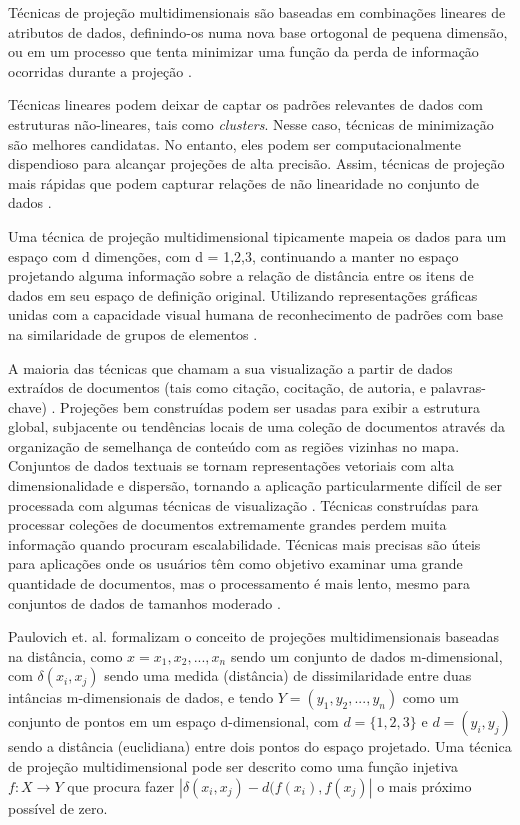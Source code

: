 Técnicas de projeção multidimensionais são baseadas em combinações lineares de atributos de dados, definindo-os numa nova base ortogonal de pequena dimensão, ou em um processo que tenta minimizar uma função da perda de informação ocorridas durante a projeção \cite{spence2001information}. 

Técnicas lineares podem deixar de captar os padrões relevantes de dados com estruturas não-lineares, tais como \textit{clusters}. Nesse caso, técnicas de minimização são melhores candidatas. No entanto, eles podem ser computacionalmente dispendioso para alcançar projeções de alta precisão. Assim, técnicas de projeção mais rápidas que podem capturar relações de não linearidade no conjunto de dados \cite{dzemyda2013multidimensional} \cite{zhu2013data}.

Uma técnica de projeção multidimensional tipicamente mapeia os dados para um espaço com d dimenções, com d = {1,2,3}, continuando a manter no espaço projetando alguma informação sobre a relação de distância entre os itens de dados em seu espaço de definição original. Utilizando representações gráficas unidas com a capacidade visual humana de reconhecimento de padrões com base na similaridade de grupos de elementos \cite{paulovich2008least}.

A maioria das técnicas  que chamam a sua visualização a partir de dados extraídos de documentos (tais como citação, cocitação, de autoria, e palavras-chave) \cite{vaz2004visualizacao}. Projeções bem construídas podem ser usadas para exibir a estrutura global, subjacente ou tendências locais de uma coleção de documentos através da organização de semelhança de conteúdo com as regiões vizinhas no mapa. Conjuntos de dados textuais se tornam representações vetoriais com alta dimensionalidade e dispersão, tornando a aplicação particularmente difícil de ser processada com algumas técnicas de visualização \cite{ward2015interactive}. 
Técnicas construídas para processar coleções de documentos extremamente grandes perdem muita informação quando procuram escalabilidade. Técnicas mais precisas são úteis para aplicações onde os usuários têm como objetivo examinar uma grande quantidade de documentos, mas o processamento é mais lento, mesmo para conjuntos de dados de tamanhos moderado \cite{ward2015interactive}.


Paulovich et. al. \cite{paulovich2008least} formalizam o conceito de projeções multidimensionais baseadas na distância, como $x={x_{1}, x_{2},...,x_{n}}$ sendo um conjunto de dados m-dimensional, com $\delta (x_{i},x_{j})$ sendo uma medida (distância) de dissimilaridade entre duas intâncias m-dimensionais de dados, e tendo $Y=(y_{1},y_{2},...,y_{n})$ como um conjunto de pontos em um espaço d-dimensional, com $d=\{1,2,3\}$ e $d=(y_{i},y_{j})$ sendo a distância (euclidiana) entre dois pontos do espaço projetado. Uma técnica de projeção multidimensional pode ser descrito como uma função injetiva $f : X\rightarrow Y$ que procura fazer $|\delta (x_{i}, x_{j})-d(f(x_{i}),f(x_{j})|$ o mais próximo possível de zero.

